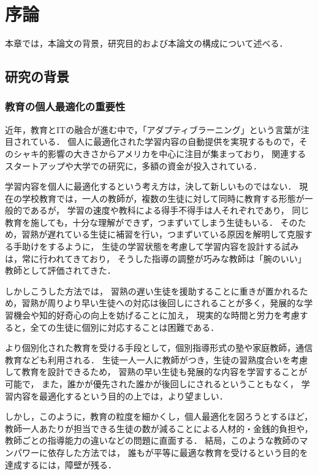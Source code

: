\chapter{序論}
\label{chap:intro}
\fancyhf{}
\rhead{\thepage}
\cfoot{\thepage}

本章では，本論文の背景，研究目的および本論文の構成について述べる．


\section{研究の背景}

\subsection{教育の個人最適化の重要性}
近年，教育とITの融合が進む中で，「アダプティブラーニング」という言葉が注目されている．
個人に最適化された学習内容の自動提供を実現するもので，そのシャキ的影響の大きさからアメリカを中心に注目が集まっており，
関連するスタートアップや大学での研究に，多額の資金が投入されている\cite{piccioli2014learning}．


学習内容を個人に最適化するという考え方は，決して新しいものではない．
現在の学校教育では，一人の教師が，複数の生徒に対して同時に教育する形態が一般的であるが，
学習の速度や教科による得手不得手は人それぞれであり，
同じ教育を施しても，十分な理解ができず，つまずいてしまう生徒もいる．
そのため，習熟が遅れている生徒に補習を行い，つまずいている原因を解明して克服する手助けをするように，
生徒の学習状態を考慮して学習内容を設計する試みは，常に行われてきており，
そうした指導の調整が巧みな教師は「腕のいい」教師として評価されてきた．

しかしこうした方法では，
習熟の遅い生徒を援助することに重きが置かれるため，習熟が周りより早い生徒への対応は後回しにされることが多く，発展的な学習機会や知的好奇心の向上を妨げることに加え，
現実的な時間と労力を考慮すると，全ての生徒に個別に対応することは困難である．


より個別化された教育を受ける手段として，個別指導形式の塾や家庭教師，通信教育なども利用される．
生徒一人一人に教師がつき，生徒の習熟度合いを考慮して教育を設計できるため，
習熟の早い生徒も発展的な内容を学習することが可能で，
また，誰かが優先された誰かが後回しにされるということもなく，
学習内容を最適化するという目的の上では，より望ましい．

しかし，このように，教育の粒度を細かくし，個人最適化を図ろうとするほど，
教師一人あたりが担当できる生徒の数が減ることによる人材的・金銭的負担や，
教師ごとの指導能力の違いなどの問題に直面する．
結局，このような教師のマンパワーに依存した方法では，
誰もが平等に最適な教育を受けるという目的を達成するには，障壁が残る．


